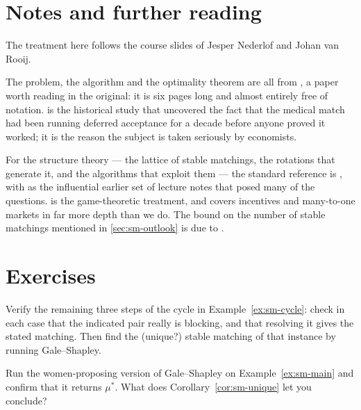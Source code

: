 \section{Notes and further reading}
\label{sec:sm-further-reading}

The treatment here follows the course slides of Jesper Nederlof and Johan van
Rooij.

The problem, the algorithm and the optimality theorem are all from
\citet{GaleShapley1962}, a paper worth reading in the original: it is six pages
long and almost entirely free of notation. \citet{Roth1984} is the historical
study that uncovered the fact that the medical match had been running deferred
acceptance for a decade before anyone proved it worked; it is the reason the
subject is taken seriously by economists.

For the structure theory --- the lattice of stable matchings, the rotations
that generate it, and the algorithms that exploit them --- the standard
reference is \citet{GusfieldIrving1989}, with \citet{Knuth1976} as the
influential earlier set of lecture notes that posed many of the questions.
\citet{RothSotomayor1990} is the game-theoretic treatment, and covers
incentives and many-to-one markets in far more depth than we do. The bound on
the number of stable matchings mentioned in \cref{sec:sm-outlook} is due to
\citet{KarlinOveisGharanWeber2018}.

\section{Exercises}

\begin{exercise}
Verify the remaining three steps of the cycle in Example~\ref{ex:sm-cycle}: check
in each case that the indicated pair really is blocking, and that resolving it
gives the stated matching. Then find the (unique?) stable matching of that
instance by running Gale--Shapley.
\end{exercise}

\begin{exercise}
Run the women-proposing version of Gale--Shapley on Example~\ref{ex:sm-main} and
confirm that it returns $\mu^*$. What does Corollary~\ref{cor:sm-unique} let you
conclude?
\end{exercise}

